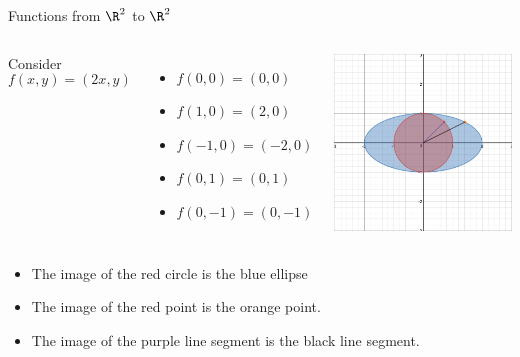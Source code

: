 \documentclass{beamer}
\begin{document}
\begin{frame}{Functions from $\R^2$ to $\R^2$}

\begin{columns}
\column[T]{5cm}
Consider
$$f(x,y) = (2x, y)$$

\begin{itemize}
\item $f(0, 0) = (0, 0)$
\item $f(1, 0) = (2, 0)$
\item $f(-1, 0) = (-2, 0)$
\item $f(0,1) = (0,1)$
\item $f(0,-1) = (0,-1)$
\end{itemize}

\column[T]{5cm}
\includegraphics[scale=0.25]{circle-to-ellipse}
\end{columns}
\begin{itemize}
\item The image of the red circle is the blue ellipse
\item The image of the red point is the orange point.
\item The image of the purple line segment is the black line segment.
\end{itemize}

\end{frame}
\end{document}
